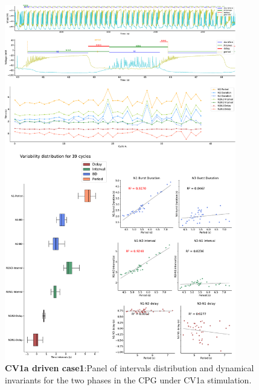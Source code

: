 \begin{figure}[htbp]
	\centering
	\includegraphics[width=0.9\textwidth]{./invariants/data/SUSSEX/CV1a_driven1/images/2phases/panel_with_intervals.pdf}
	\caption{\textbf{CV1a driven case1}:Panel of intervals distribution and dynamical invariants for the two phases in the CPG under CV1a stimulation.}
	\label{fig:cv1a 1 2phases}
\end{figure}


